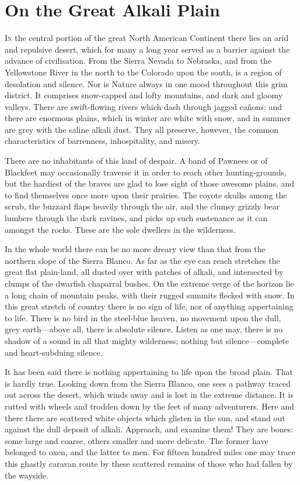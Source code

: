 \chapter{On the Great Alkali Plain}
\lettrine{I}{n} the central portion of the great North American Continent there lies an arid and repulsive desert, which for many a long year served as a barrier against the advance of civilisation. From the Sierra Nevada to Nebraska, and from the Yellowstone River in the north to the Colorado upon the south, is a region of desolation and silence. Nor is Nature always in one mood throughout this grim district. It comprises snow-capped and lofty mountains, and dark and gloomy valleys. There are swift-flowing rivers which dash through jagged cañons; and there are enormous plains, which in winter are white with snow, and in summer are grey with the saline alkali dust. They all preserve, however, the common characteristics of barrenness, inhospitality, and misery.

There are no inhabitants of this land of despair. A band of Pawnees or of Blackfeet may occasionally traverse it in order to reach other hunting-grounds, but the hardiest of the braves are glad to lose sight of those awesome plains, and to find themselves once more upon their prairies. The coyote skulks among the scrub, the buzzard flaps heavily through the air, and the clumsy grizzly bear lumbers through the dark ravines, and picks up such sustenance as it can amongst the rocks. These are the sole dwellers in the wilderness.

In the whole world there can be no more dreary view than that from the northern slope of the Sierra Blanco. As far as the eye can reach stretches the great flat plain-land, all dusted over with patches of alkali, and intersected by clumps of the dwarfish chaparral bushes. On the extreme verge of the horizon lie a long chain of mountain peaks, with their rugged summits flecked with snow. In this great stretch of country there is no sign of life, nor of anything appertaining to life. There is no bird in the steel-blue heaven, no movement upon the dull, grey earth—above all, there is absolute silence. Listen as one may, there is no shadow of a sound in all that mighty wilderness; nothing but silence—complete and heart-subduing silence.

It has been said there is nothing appertaining to life upon the broad plain. That is hardly true. Looking down from the Sierra Blanco, one sees a pathway traced out across the desert, which winds away and is lost in the extreme distance. It is rutted with wheels and trodden down by the feet of many adventurers. Here and there there are scattered white objects which glisten in the sun, and stand out against the dull deposit of alkali. Approach, and examine them! They are bones: some large and coarse, others smaller and more delicate. The former have belonged to oxen, and the latter to men. For fifteen hundred miles one may trace this ghastly caravan route by these scattered remains of those who had fallen by the wayside.

